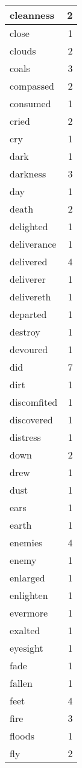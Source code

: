 \begin{center}
\begin{longtable}{l|r}
cleanness & 2 \\ \hline
close & 1 \\ \hline
clouds & 2 \\ \hline
coals & 3 \\ \hline
compassed & 2 \\ \hline
consumed & 1 \\ \hline
cried & 2 \\ \hline
cry & 1 \\ \hline
dark & 1 \\ \hline
darkness & 3 \\ \hline
day & 1 \\ \hline
death & 2 \\ \hline
delighted & 1 \\ \hline
deliverance & 1 \\ \hline
delivered & 4 \\ \hline
deliverer & 1 \\ \hline
delivereth & 1 \\ \hline
departed & 1 \\ \hline
destroy & 1 \\ \hline
devoured & 1 \\ \hline
did & 7 \\ \hline
dirt & 1 \\ \hline
discomfited & 1 \\ \hline
discovered & 1 \\ \hline
distress & 1 \\ \hline
down & 2 \\ \hline
drew & 1 \\ \hline
dust & 1 \\ \hline
ears & 1 \\ \hline
earth & 1 \\ \hline
enemies & 4 \\ \hline
enemy & 1 \\ \hline
enlarged & 1 \\ \hline
enlighten & 1 \\ \hline
evermore & 1 \\ \hline
exalted & 1 \\ \hline
eyesight & 1 \\ \hline
fade & 1 \\ \hline
fallen & 1 \\ \hline
feet & 4 \\ \hline
fire & 3 \\ \hline
floods & 1 \\ \hline
fly & 2 \\ \hline

\end{longtable}
\end{center}
